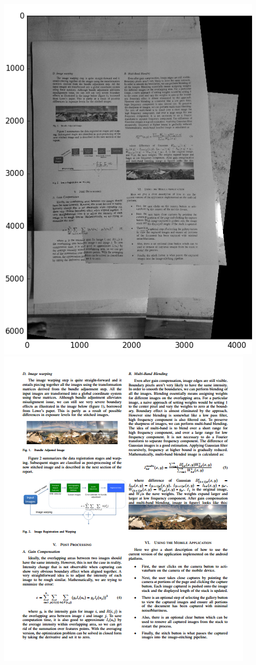 \documentclass{article}
\begin{document}
\includegraphics[scale=0.25]{badlani/figure_1}
\includegraphics[scale=0.3]{badlani/original}
\end{document}
